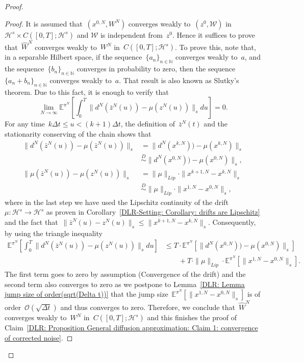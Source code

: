 \begin{proof}
\begin{proof}
    It is assumed that~$(x^{0,N}, W^N)$ converges weakly to~$(z^0, \mathcal{W})$ in $\mathcal{H}^s \times C([0,T]; \mathcal{H}^s)$ and $\mathcal{W}$ is independent from~$z^0$. Hence it suffices to prove that~$\widehat{W}^N$ converges weakly to~$W^N$ in~$C([0,T]; \mathcal{H}^s)$. To prove this, note that, in a separable Hilbert space, if the sequence~$\{ a_n \}_{n \in \mathbb{N}}$ converges weakly to~$a$, and the sequence~$\{ b_n \}_{n \in \mathbb{N}}$ converges in probability to zero, then the sequence~$\{ a_n + b_n \}_{n \in \mathbb{N}}$ converges weakly to~$a$. That result is also known as Slutky's theorem. Due to this fact, it is enough to verify that
    \begin{equation}
      \lim_{N\to \infty} \mathbb{E}^{\pi^N} \left[ \int_0^T  \| d^N(\bar{z}^N(u)) - \mu(z^N(u)) \|_s du \right] = 0.
    \end{equation}
    For any time~$ k \Delta t \leq u < (k+1)\Delta t $, the definition of~$\bar{z}^N(t)$ and the stationarity conserving of the chain shows that
    \begin{align*}
      \| d^N(\bar{z}^N(u)) - \mu(\bar{z}^N(u)) \|_s & = \| d^N(x^{k,N})) - \mu(x^{k,N}) \|_s \\
      & \stackrel{D}{\sim} \| d^N(x^{0,N})) - \mu(x^{0,N}) \|_s, \\
      \| \mu(\bar{z}^N(u)) - \mu(z^N(u)) \|_s & = \|  \mu \|_{Lip} \cdot \| x^{k+1,N} - x^{k,N} \|_s \\
      & \stackrel{D}{\sim} \|  \mu \|_{Lip} \cdot \| x^{1,N} - x^{0,N} \|_s,
    \end{align*}
    where in the last step we have used the Lipschitz continuity of the drift~$\mu: \mathcal{H}^s \to \mathcal{H}^s$ as proven in Corollary~\ref{DLR-Setting: Corollary: drifts are Lipschitz} and the fact that~$\| \bar{z}^N(u) - z^N(u) \|_s \leq \| x^{k+1,N} - x^{k,N} \|_s$.  Consequently, by using the triangle inequality
    \begin{align*}
     \mathbb{E}^{\pi^N} \left[ \int_0^T  \| d^N(\bar{z}^N(u)) - \mu(z^N(u)) \|_s du \right] & \leq T \cdot \mathbb{E}^{\pi^N} \left[ \| d^N(x^{0,N})) - \mu(x^{0,N}) \|_s \right] \\
     & \qquad + T \cdot  \|  \mu \|_{Lip} \cdot  \mathbb{E}^{\pi^N} \left[ \| x^{1,N} - x^{0,N} \|_s \right] .
    \end{align*}
    The first term goes to zero by assumption (Convergence of the drift) and the second term also converges to zero as we postpone to Lemma~\ref{DLR: Lemma jump size of order(sqrt(Delta t))} that the jump size~$\mathbb{E}^{\pi^N} \left[ \| x^{1,N} - x^{0,N} \|_s \right]$ is of order~$\mathcal{O}(\sqrt{\Delta t})$ and thus converges to zero. Therefore, we conclude that~$\widehat{W}^N$ converges weakly to~$W^N$ in~$C([0,T]; \mathcal{H}^s)$ and this finishes the proof of Claim~\ref{DLR: Proposition General diffusion approximation: Claim 1: convergence of corrected noise}.
  \end{proof}   
  

\end{proof}

